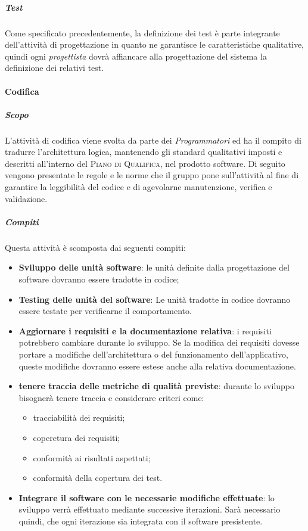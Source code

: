 \subparagraph{Test}

Come specificato precedentemente, la definizione dei test è parte integrante dell'attività di progettazione in quanto ne garantisce le caratteristiche qualitative, quindi ogni \emph{progettista} dovrà affiancare alla progettazione del sistema la definizione dei relativi test.


\paragraph{Codifica}
\label{ssub:codifica}
\subparagraph{Scopo}
\label{par:codifica:scopo}
L'attività di codifica viene svolta da parte dei \emph{Programmatori} ed ha il compito di tradurre l'architettura logica, mantenendo gli
standard qualitativi imposti e descritti all'interno del \textsc{Piano di Qualifica}, nel prodotto software. Di seguito vengono presentate
le regole e le norme che il gruppo pone sull'attività al fine di garantire la leggibilità del codice e di agevolarne manutenzione,
verifica e validazione.

\subparagraph{Compiti}
\label{par:codifica:Compiti}
Questa attività è scomposta dai seguenti compiti:
\begin{itemize}
    \item \textbf{Sviluppo delle unità software}: le unità definite dalla progettazione del software dovranno essere tradotte in codice;
    \item \textbf{Testing delle unità del software}: Le unità tradotte in codice dovranno essere testate per verificarne il comportamento.
    \item \textbf{Aggiornare i requisiti e la documentazione relativa}: i requisiti potrebbero cambiare durante lo sviluppo. Se la modifica dei requisiti dovesse portare a modifiche dell'architettura o del funzionamento dell'applicativo, queste modifiche dovranno essere estese anche alla relativa documentazione.
    \item \textbf{tenere traccia delle metriche di qualità previste}: durante lo sviluppo bisognerà tenere traccia e considerare criteri come:
        \begin{itemize}
            \item tracciabilità dei requisiti;
            \item coperetura dei requisiti;
            \item conformità ai risultati aspettati;
            \item conformità della copertura dei test.
        \end{itemize}
    \item \textbf{Integrare il software con le necessarie modifiche effettuate}: lo sviluppo verrà effettuato mediante successive iterazioni. Sarà necessario quindi, che ogni iterazione sia integrata con il software presistente.
\end{itemize}

